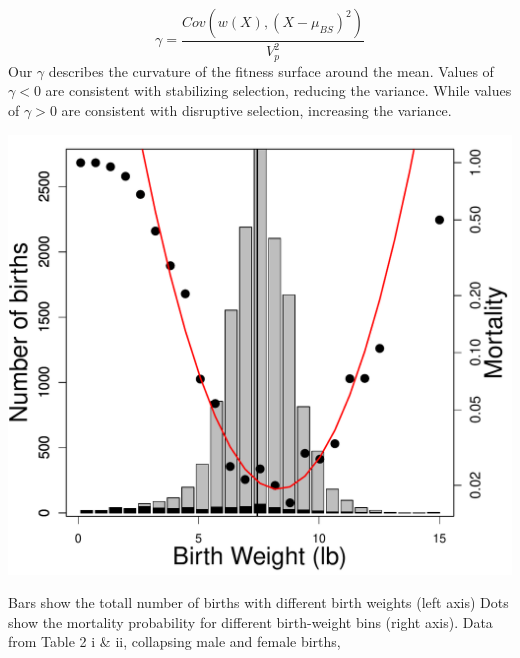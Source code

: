 \begin{equation}
\gamma = \frac{Cov\left(w(X), (X-\mu_{BS})^2 \right)}{V_p^2}
\end{equation}
Our $\gamma$ describes the curvature of the fitness surface around the
mean. 
Values of $\gamma<0$  are consistent with stabilizing selection,
reducing the variance. While values of $\gamma>0$ are consistent with disruptive
selection, increasing the variance. 



\begin{marginfigure}
\begin{center}
\includegraphics[width= \textwidth]{Journal_figs/Quant_gen/birth_weight/Karn_Penrose_birth_weight.pdf}
\end{center}
\caption{Bars show the totall number of births with different birth
  weights (left axis)  Dots show the mortality probability for different
  birth-weight bins (right axis). Data from \citet{karn1951birth}
  Table 2 i \& ii, collapsing male and female births,  } \label{fig:Birth_weight}  
\end{marginfigure}

